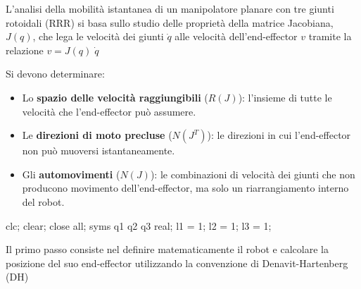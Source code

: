 \documentclass[11pt, a4paper]{article}
\begin{document}

\begin{par}
\begin{flushleft}
L'analisi della mobilità istantanea di un manipolatore planare con tre giunti rotoidali (RRR) si basa sullo studio delle proprietà della matrice Jacobiana, $J(q)$, che lega le velocità dei giunti $\dot{q}$ alle velocità dell'end-effector $v$ tramite la relazione $v=J(q)\;\dot{q}$
\end{flushleft}
\end{par}

\begin{par}
\begin{flushleft}
Si devono determinare:
\end{flushleft}
\end{par}

\begin{itemize}
   \item{\begin{flushleft} Lo \textbf{spazio delle velocità raggiungibili} ($R(J)$): l'insieme di tutte le velocità che l'end-effector può assumere. \end{flushleft}}
   \item{\begin{flushleft} Le \textbf{direzioni di moto precluse} ($N(J^T )$): le direzioni in cui l'end-effector non può muoversi istantaneamente. \end{flushleft}}
   \item{\begin{flushleft} Gli \textbf{automovimenti} ($N(J)$): le combinazioni di velocità dei giunti che non producono movimento dell'end-effector, ma solo un riarrangiamento interno del robot. \end{flushleft}}
\end{itemize}

\begin{matlabcode}
clc; clear; close all;
syms q1 q2 q3 real;
l1 = 1; l2 = 1; l3 = 1;
\end{matlabcode}

\begin{par}
\begin{flushleft}
Il primo passo consiste nel definire matematicamente il robot e calcolare la posizione del suo end-effector utilizzando la convenzione di Denavit-Hartenberg (DH)
\end{flushleft}
\end{par}
\end{document}
